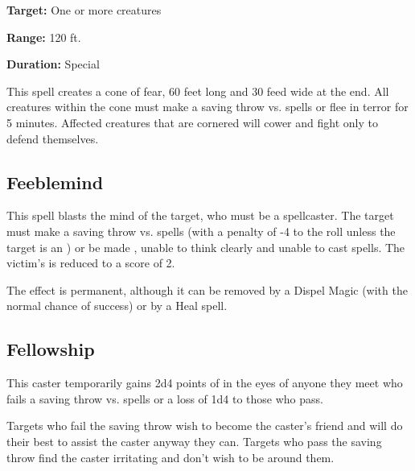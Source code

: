 \begin{multicols*}{2}
{\textbf{Target:} One or more creatures

\textbf{Range:} 120 ft.

\textbf{Duration:} Special}

This spell creates a cone of fear, 60 feet long and 30 feed wide at the end. All creatures within the cone must make a saving throw vs. spells or flee in terror for 5 minutes. Affected creatures that are cornered will cower and fight only to defend themselves.

\subsection{Feeblemind}\label{spell:Feeblemind}

This spell blasts the mind of the target, who must be a spellcaster. The target must make a saving throw vs. spells (with a penalty of -4 to the roll unless the target is an ) or be made , unable to think clearly and unable to cast spells. The victim’s  is reduced to a score of 2.

The effect is permanent, although it can be removed by a Dispel Magic (with the normal chance of success) or by a Heal spell.

\subsection{Fellowship}\label{spell:Fellowship}

This caster temporarily gains 2d4 points of  in the eyes of anyone they meet who fails a saving throw vs. spells or a loss of 1d4 to those who pass.

Targets who fail the saving throw wish to become the caster's friend and will do their best to assist the caster anyway they can. Targets who pass the saving throw find the caster irritating and don't wish to be around them.


\end{multicols*}
